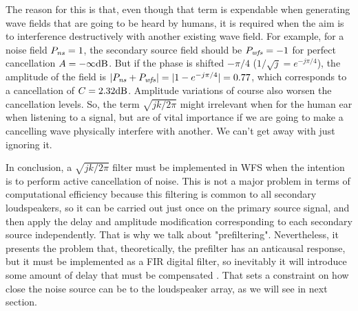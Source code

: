 
The reason for this is that, even though that term is expendable when generating wave fields that are going to be heard by humans, it is required when the aim is to interference destructively with another existing wave field. For example, for a noise field $\Field[ns][frequency] = 1$, the secondary source field should be $\Field[wfs][frequency] = -1$ for perfect cancellation $\attenuation = -\infty \si{dB}$. But if the phase is shifted $-\pi/4$ ($1/\sqrt{j} = e^{-j\pi/4}$), the amplitude of the field is $|\Field[ns][frequency] + \Field[wfs][frequency]| = |1 - e^{-j\pi/4}| = 0.77$, which corresponds to a cancellation of $\cancellation = 2.32\si{dB}$. Amplitude variations of course also worsen the cancellation levels. So, the term $\sqrt{jk/2\pi}$ might irrelevant when for the human ear when listening to a signal, but are of vital importance if we are going to make a cancelling wave physically interfere with another. We can't get away with just ignoring it.

In conclusion, %
a $\sqrt{jk/2\pi}$ filter must be implemented in WFS when the intention is to perform active cancellation of noise.
This is not a major problem in terms of computational efficiency because this filtering is common to all secondary loudspeakers, so it can be carried out just once on the primary source signal, and then apply the delay and amplitude modification corresponding to each secondary source independently. That is why we talk about "prefiltering".
Nevertheless, it presents the problem that, theoretically, the prefilter has an anticausal response, but it must be implemented as a FIR digital filter, so inevitably it will introduce some amount of delay that must be compensated \cite{Lapini2018}. That sets a constraint on how close the noise source can be to the loudspeaker array, as we will see in next section.

